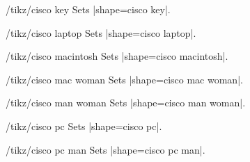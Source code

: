 \documentclass[a4paper]{ltxdoc}
\begin{document}
\begin{stylekey}{/tikz/cisco key}
Sets |shape={cisco key}|.
\begin{codeexample}[preamble={\usetikzlibrary{shapes.cisco.key}}]
\end{codeexample}
\end{stylekey}

\begin{stylekey}{/tikz/cisco laptop}
Sets |shape={cisco laptop}|.
\begin{codeexample}[preamble={\usetikzlibrary{shapes.cisco.laptop}}]
\end{codeexample}
\end{stylekey}

\begin{stylekey}{/tikz/cisco macintosh}
Sets |shape={cisco macintosh}|.
\begin{codeexample}[preamble={\usetikzlibrary{shapes.cisco.macintosh}}]
\end{codeexample}
\end{stylekey}

\begin{stylekey}{/tikz/cisco mac woman}
Sets |shape={cisco mac woman}|.
\begin{codeexample}[preamble={\usetikzlibrary{shapes.cisco.macwoman}}]
\end{codeexample}
\end{stylekey}

\begin{stylekey}{/tikz/cisco man woman}
Sets |shape={cisco man woman}|.
\begin{codeexample}[preamble={\usetikzlibrary{shapes.cisco.manwoman}}]
\end{codeexample}
\end{stylekey}

\begin{stylekey}{/tikz/cisco pc}
Sets |shape={cisco pc}|.
\begin{codeexample}[preamble={\usetikzlibrary{shapes.cisco.pc}}]
\tikz{\node[cisco pc] {};}
\end{codeexample}
\end{stylekey}

\begin{stylekey}{/tikz/cisco pc man}
Sets |shape={cisco pc man}|.
\begin{codeexample}[preamble={\usetikzlibrary{shapes.cisco.pcman}}]
\end{codeexample}
\end{stylekey}
\end{document}
